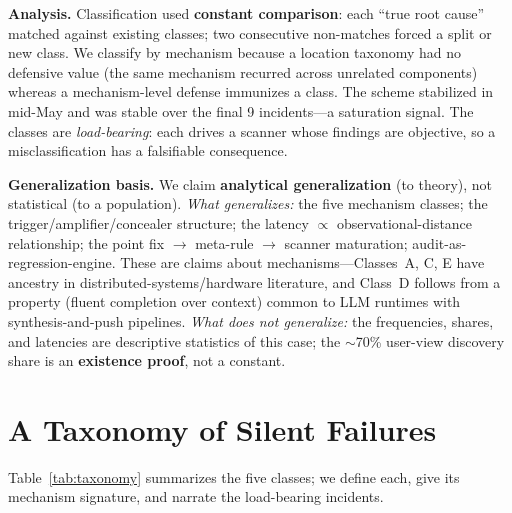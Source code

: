 \documentclass[conference]{IEEEtran}
\begin{document}
\textbf{Analysis.} Classification used \textbf{constant comparison}: each
``true root cause'' matched against existing classes; two consecutive
non-matches forced a split or new class. We classify by mechanism because
a location taxonomy had no defensive value (the same mechanism recurred
across unrelated components) whereas a mechanism-level defense immunizes a
class. The scheme stabilized in mid-May and was stable over the final 9
incidents---a saturation signal. The classes are \emph{load-bearing}: each
drives a scanner whose findings are objective, so a misclassification has
a falsifiable consequence.

\textbf{Generalization basis.} We claim \textbf{analytical
generalization} (to theory), not statistical (to a population). \emph{What
generalizes:} the five mechanism classes; the trigger/amplifier/concealer
structure; the latency $\propto$ observational-distance relationship; the
point fix $\to$ meta-rule $\to$ scanner maturation;
audit-as-regression-engine. These are claims about mechanisms---Classes~A,
C, E have ancestry in distributed-systems/hardware literature, and Class~D
follows from a property (fluent completion over context) common to LLM
runtimes with synthesis-and-push pipelines. \emph{What does not
generalize:} the frequencies, shares, and latencies are descriptive
statistics of this case; the $\sim$70\% user-view discovery share is an
\textbf{existence proof}, not a constant.

\section{A Taxonomy of Silent Failures}\label{sec:taxonomy}
Table~\ref{tab:taxonomy} summarizes the five classes; we define each, give
its mechanism signature, and narrate the load-bearing incidents.
\end{document}
